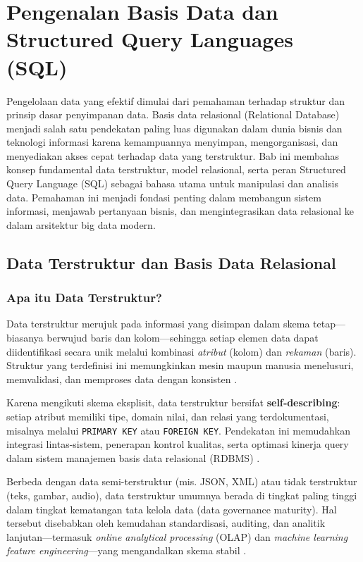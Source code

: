 \chapter{Pengenalan Basis Data dan Structured Query Languages (SQL)}

Pengelolaan data yang efektif dimulai dari pemahaman terhadap struktur dan prinsip dasar penyimpanan data. Basis data relasional (Relational Database) menjadi salah satu pendekatan paling luas digunakan dalam dunia bisnis dan teknologi informasi karena kemampuannya menyimpan, mengorganisasi, dan menyediakan akses cepat terhadap data yang terstruktur. Bab ini membahas konsep fundamental data terstruktur, model relasional, serta peran Structured Query Language (SQL) sebagai bahasa utama untuk manipulasi dan analisis data. Pemahaman ini menjadi fondasi penting dalam membangun sistem informasi, menjawab pertanyaan bisnis, dan mengintegrasikan data relasional ke dalam arsitektur big data modern.


\section{Data Terstruktur dan Basis Data Relasional}
\subsection{Apa itu Data Terstruktur?}

Data terstruktur merujuk pada informasi yang disimpan dalam skema tetap—biasanya berwujud baris dan kolom—sehingga setiap elemen data dapat diidentifikasi secara unik melalui kombinasi \emph{atribut} (kolom) dan \emph{rekaman} (baris). Struktur yang terdefinisi ini memungkinkan mesin maupun manusia menelusuri, memvalidasi, dan memproses data dengan konsisten \cite{codd1970}.  

Karena mengikuti skema eksplisit, data terstruktur bersifat \textbf{self‐describing}: setiap atribut memiliki tipe, domain nilai, dan relasi yang terdokumentasi, misalnya melalui \texttt{PRIMARY KEY} atau \texttt{FOREIGN KEY}. Pendekatan ini memudahkan integrasi lintas-sistem, penerapan kontrol kualitas, serta optimasi kinerja query dalam sistem manajemen basis data relasional (RDBMS) \cite{elmasri2016}.  

Berbeda dengan data semi-terstruktur (mis. JSON, XML) atau tidak terstruktur (teks, gambar, audio), data terstruktur umumnya berada di tingkat paling tinggi dalam tingkat kematangan tata kelola data (data governance maturity). Hal tersebut disebabkan oleh kemudahan standardisasi, auditing, dan analitik lanjutan—termasuk \emph{online analytical processing} (OLAP) dan \emph{machine learning feature engineering}—yang mengandalkan skema stabil \cite{kimball2013}.  

